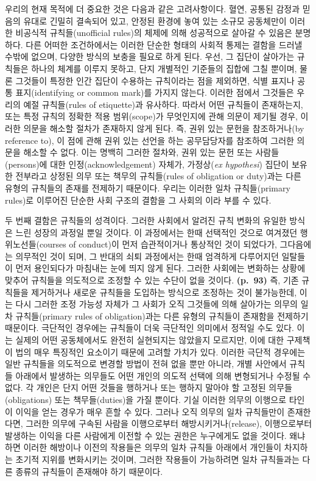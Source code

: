 우리의 현재 목적에 더 중요한 것은 다음과 같은 고려사항이다. 혈연, 공통된
감정과 믿음의 유대로 긴밀히 결속되어 있고, 안정된 환경에 놓여 있는
소규모 공동체만이 이러한 비공식적 규칙들(unofficial rules)의 체제에 의해
성공적으로 살아갈 수 있음은 분명하다. 다른 어떠한 조건하에서는 이러한
단순한 형태의 사회적 통제는 결함을 드러낼 수밖에 없으며, 다양한 방식의
보충을 필요로 하게 된다. 우선, 그 집단이 살아가는 규칙들은 하나의 체계를
이루지 못하고, 단지 개별적인 기준들의 집합에 그칠 뿐이며, 물론 그것들이
특정한 인간 집단이 수용하는 규칙이라는 점을 제외하면, 식별 표지나 공통
표지(identifying or common mark)를 가지지 않는다. 이러한 점에서 그것들은
우리의 예절 규칙들(rules of etiquette)과 유사하다. 따라서 어떤 규칙들이
존재하는지, 또는 특정 규칙의 정확한 적용 범위(scope)가 무엇인지에 관해
의문이 제기될 경우, 이러한 의문을 해소할 절차가 존재하지 않게 된다. 즉,
권위 있는 문헌을 참조하거나(by reference to), 이 점에 관해 권위 있는
선언을 하는 공무담당자를 참조하여 그러한 의문을 해소할 수 없다. 이는
명백히 그러한 절차와, 권위 있는 문헌 또는 사람들(persons)에 대한
인정(acknowledgement) 자체가, 가정상(\emph{ex hypothesi}) 집단이 보유한
전부라고 상정된 의무 또는 책무의 규칙들(rules of obligation or duty)과는
다른 유형의 규칙들의 존재를 전제하기 때문이다. 우리는 이러한 일차
규칙들(primary rules)로 이루어진 단순한 사회 구조의 결함을 그 사회의
이라 부를 수 있다.

두 번째 결함은 규칙들의  성격이다. 그러한 사회에서
알려진 규칙 변화의 유일한 방식은 느린 성장의 과정일 뿐일 것이다. 이
과정에서는 한때 선택적인 것으로 여겨졌던 행위노선들(courses of
conduct)이 먼저 습관적이거나 통상적인 것이 되었다가, 그다음에는 의무적인
것이 되며, 그 반대의 쇠퇴 과정에서는 한때 엄격하게 다루어지던 일탈들이
먼저 용인되다가 마침내는 눈에 띄지 않게 된다. 그러한 사회에는 변화하는
상황에 맞추어 규칙들을 의도적으로 조정할 수 있는 수단이 없을 것이다.
\textbf{(p.~93)} 즉, 기존 규칙들을 제거하거나 새로운 규칙들을 도입하는
방식으로 조정하는 것이 불가능한데, 이는 다시 그러한 조정 가능성 자체가
그 사회가 오직 그것들에 의해 살아가는 의무의 일차 규칙들(primary rules
of obligation)과는 다른 유형의 규칙들이 존재함을 전제하기 때문이다.
극단적인 경우에는 규칙들이 더욱 극단적인 의미에서 정적일 수도 있다. 이는
실제의 어떤 공동체에서도 완전히 실현되지는 않았을지 모르지만, 이에 대한
구제책이 법의 매우 특징적인 요소이기 때문에 고려할 가치가 있다. 이러한
극단적 경우에는 일반 규칙들을 의도적으로 변경할 방법이 전혀 없을 뿐만
아니라, 개별 사안에서 규칙들 아래에서 발생하는 의무들도 어떤 개인의
의도적 선택에 의해 변형되거나 수정될 수 없다. 각 개인은 단지 어떤 것들을
행하거나 또는 행하지 말아야 할 고정된 의무들(obligations) 또는
책무들(duties)을 가질 뿐이다. 기실 이러한 의무의 이행으로 타인이 이익을
얻는 경우가 매우 흔할 수 있다. 그러나 오직 의무의 일차 규칙들만이
존재한다면, 그러한 의무에 구속된 사람을 이행으로부터
해방시키거나(release), 이행으로부터 발생하는 이익을 다른 사람에게 이전할
수 있는 권한은 누구에게도 없을 것이다. 왜냐하면 이러한 해방이나 이전의
작용들은 의무의 일차 규칙들 아래에서 개인들이 차지하는 초기적 지위를
변화시키는 것이며, 그러한 작용들이 가능하려면 일차 규칙들과는 다른
종류의 규칙들이 존재해야 하기 때문이다.

